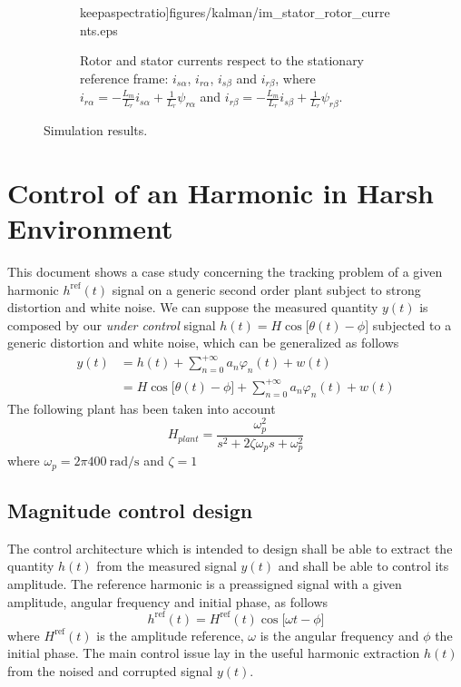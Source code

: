 \documentclass[11pt,a4paper,oneside]{book}
\numberwithin{equation}{section}
\theoremstyle{it}
\theoremstyle{definition}
\begin{document}
\begin{figure}[H]
\begin{subfigure}{.5\textwidth}
		keepaspectratio]{figures/kalman/im_stator_rotor_currents.eps}
		\captionsetup{width=.75\textwidth}
		\caption{Rotor and stator currents respect to the stationary reference 
			frame:  $i_{s\alpha}$, $i_{r\alpha}$, $i_{s\beta}$ and 
			$i_{r\beta}$, 
			where $i_{r\alpha} = 
			-\frac{L_m}{L_r}i_{s\alpha}+\frac{1}{L_r}\psi_{r\alpha}$ and 
			$i_{r\beta} = 
			-\frac{L_m}{L_r}i_{s\beta}+\frac{1}{L_r}\psi_{r\beta}$.}
		\label{figure_im_sim3}
	\end{subfigure}
	\caption{Simulation results.}
	\label{}
\end{figure}

\section{Control of an Harmonic in Harsh Environment}
This document shows a case study concerning the tracking problem of a given 
harmonic $h^{\text{ref}}(t)$ signal on a generic second order plant subject to 
strong distortion and white noise. We can suppose the measured quantity $y(t)$ 
is composed by our \textit{under control} signal $h(t) = H\cos\big[\theta(t) - 
\phi\big]$ subjected to a generic distortion and white noise, which can be 
generalized as follows
\begin{equation}
	\begin{aligned}
		y(t) &= h(t) + \sum_{n=0}^{+\infty}a_n\varphi_n(t) + w(t) \\[6pt]
		&= H\cos\big[\theta(t) - \phi\big] + 
		\sum_{n=0}^{+\infty}a_n\varphi_n(t) + w(t)
	\end{aligned}
\end{equation}
The following plant has been taken into account
\begin{equation}
	H_{plant} = \frac{\omega_p^2}{s^2+2\zeta\omega_p s + \omega_p^2}
\end{equation}
where $\omega_p=2\pi\SI{400}{\radian\per\second}$ and $\zeta=\SI{1}{}$
\subsection{Magnitude control design}
The control architecture which is intended to design shall be able to extract 
the quantity $h(t)$ from the measured signal $y(t)$ and shall be able to 
control its amplitude. The reference harmonic is a preassigned signal with a 
given amplitude, angular frequency and initial phase, as follows
\begin{equation}
	h^{\text{ref}}(t) = H^{\text{ref}}(t)\cos\big[\omega t - \phi\big]
\end{equation} 
where $H^{\text{ref}}(t)$ is the amplitude reference, $\omega$ is the angular 
frequency and $\phi$ the initial phase. The main control issue lay in the 
useful harmonic extraction $h(t)$ from the noised and corrupted signal $y(t)$.
\end{document}
